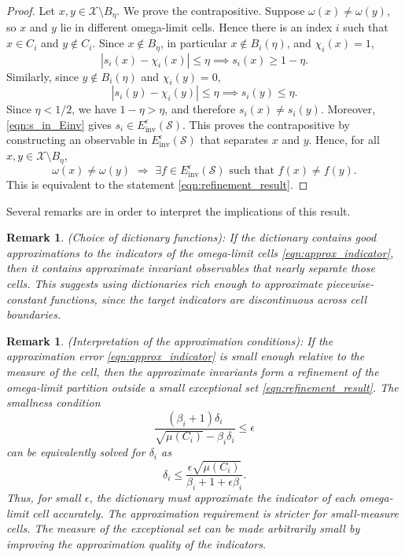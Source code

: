 \documentclass[letterpaper, 10 pt, conference]{ieeeconf}
\newcommand{\Sc}{\mathcal{S}}
\newcommand{\Xc}{\mathcal{X}}
\newcommand{\longthmtitle}[1]{\mbox{}{\textit{(#1):}}}
\newtheorem{remark}[theorem]{Remark}
\begin{document}
\begin{proof}
Let $x,y\in \Xc\setminus B_\eta$. We prove the contrapositive. Suppose $\omega(x)\neq\omega(y)$, so $x$ and $y$ lie in different omega-limit cells. Hence there is an index $i$ such that $x\in C_i$ and $y\notin C_i$. Since $x\notin B_\eta$, in particular $x\notin B_i(\eta)$, and $\chi_i(x)=1$,
\begin{equation}
    |s_i(x)-\chi_i(x)|\leq \eta \implies s_i(x)\geq 1-\eta.
\end{equation}
Similarly, since $y\notin B_i(\eta)$ and $\chi_i(y)=0$,
\begin{equation}
|s_i(y)-\chi_i(y)|\leq \eta \implies s_i(y)\leq \eta.
\end{equation}
Since $\eta<1/2$, we have $1-\eta > \eta$, and therefore $s_i(x)\neq s_i(y)$.
Moreover, \eqref{eqn:s_in_Einv} gives $s_i\in E_{\text{inv}}^{\epsilon}(\Sc)$. This proves the contrapositive by constructing an observable in $E_{\text{inv}}^{\epsilon}(\Sc)$ that separates $x$ and $y$. Hence, for all $x,y\in \Xc\setminus B_\eta$,
\[
    \omega(x)\neq \omega(y)
    \,\, \Longrightarrow \,\,
    \exists f\in E_{\text{inv}}^{\epsilon}(\Sc)\text{ such that }f(x)\neq f(y).
\]
This is equivalent to the statement \eqref{eqn:refinement_result}.
\end{proof}

Several remarks are in order to interpret the implications of this result. 

\begin{remark}\longthmtitle{Choice of dictionary functions}
If the dictionary contains good approximations to the indicators of the omega-limit cells \eqref{eqn:approx_indicator}, then it contains approximate invariant observables that nearly separate those cells. This suggests using dictionaries rich enough to approximate piecewise-constant functions, since the target indicators are discontinuous across cell boundaries.
\end{remark}

\begin{remark}\longthmtitle{Interpretation of the approximation conditions}
If the approximation error \eqref{eqn:approx_indicator} is small enough relative to the measure of the cell, then the approximate invariants form a refinement of the omega-limit partition outside a small exceptional set \eqref{eqn:refinement_result}. The smallness condition
\[
    \frac{(\beta_i+1)\delta_i}
    {\sqrt{\mu(C_i)}-\beta_i\delta_i}
    \leq \epsilon
\]
can be equivalently solved for $\delta_i$ as
\[
    \delta_i
    \leq
    \frac{\epsilon\sqrt{\mu(C_i)}}{\beta_i+1+\epsilon\beta_i}.
\]
Thus, for small $\epsilon$, the dictionary must approximate the indicator of each omega-limit cell accurately. The approximation requirement is stricter for small-measure cells. The measure of the exceptional set can be made arbitrarily small by improving the approximation quality of the indicators.
\end{remark}
\end{document}
